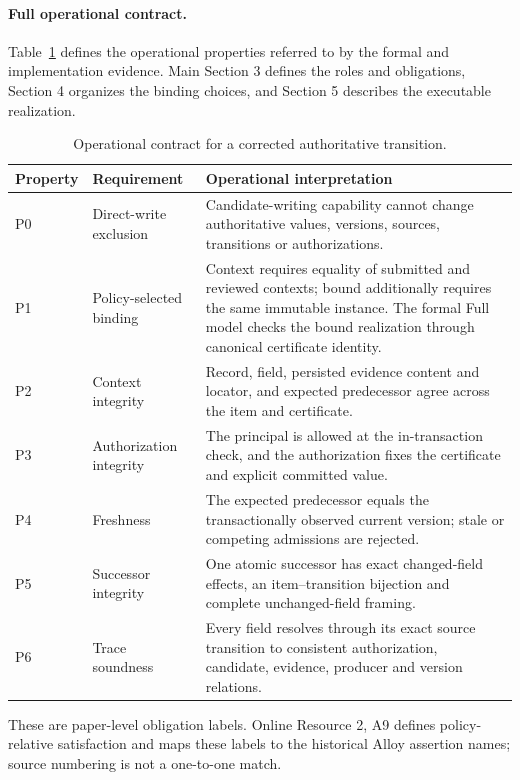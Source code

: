 \documentclass[11pt,a4paper]{article}
\begin{document}
\paragraph{Full operational contract.}
Table~\ref{tab:s-contract} defines the operational properties referred to by the formal and implementation evidence. Main Section 3 defines the roles and obligations, Section 4 organizes the binding choices, and Section 5 describes the executable realization.
\begin{table}[htbp]
\centering\small
\caption{Operational contract for a corrected authoritative transition.}
\label{tab:s-contract}
\begin{tabularx}{\textwidth}{@{}l>{\raggedright\arraybackslash}p{}X@{}}
\toprule
Property & Requirement & Operational interpretation \\
\midrule
P0 & Direct-write exclusion & Candidate-writing capability cannot change authoritative values, versions, sources, transitions or authorizations. \\
P1 & Policy-selected binding & Context requires equality of submitted and reviewed contexts; bound additionally requires the same immutable instance. The formal Full model checks the bound realization through canonical certificate identity. \\
P2 & Context integrity & Record, field, persisted evidence content and locator, and expected predecessor agree across the item and certificate. \\
P3 & Authorization integrity & The principal is allowed at the in-transaction check, and the authorization fixes the certificate and explicit committed value. \\
P4 & Freshness & The expected predecessor equals the transactionally observed current version; stale or competing admissions are rejected. \\
P5 & Successor integrity & One atomic successor has exact changed-field effects, an item--transition bijection and complete unchanged-field framing. \\
P6 & Trace soundness & Every field resolves through its exact source transition to consistent authorization, candidate, evidence, producer and version relations. \\
\bottomrule
\end{tabularx}
\end{table}

These are paper-level obligation labels. Online Resource 2, A9 defines policy-relative satisfaction and maps these labels to the historical Alloy assertion names; source numbering is not a one-to-one match.
\end{document}
